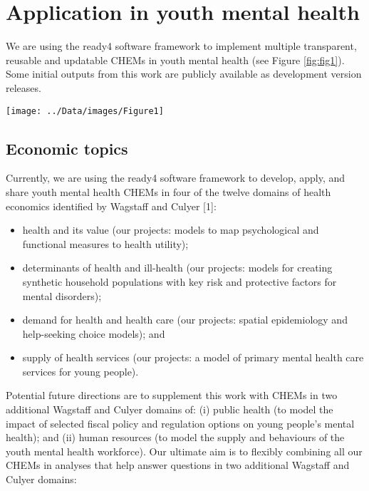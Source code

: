 \documentclass[
]{article}
\let\origfigure\figure
\let\endorigfigure\endfigure
\renewenvironment{figure}[1][2] {
    \expandafter\origfigure\expandafter[H]
} {
    \endorigfigure
}
\begin{document}
\hypertarget{application-in-youth-mental-health}{%
\section{Application in youth mental health}\label{application-in-youth-mental-health}}

We are using the ready4 software framework to implement multiple transparent, reusable and updatable CHEMs in youth mental health (see Figure \ref{fig:fig1}). Some initial outputs from this work are publicly available as development version releases.

\begin{figure}
\texttt{[image: ../Data/images/Figure1]} \caption{High level summary of planned implementation of youth mental health economic model}\label{fig:fig1}
\end{figure}

\hypertarget{economic-topics}{%
\subsection{Economic topics}\label{economic-topics}}

Currently, we are using the ready4 software framework to develop, apply, and share youth mental health CHEMs in four of the twelve domains of health economics identified by Wagstaff and Culyer {[}1{]}:

\begin{itemize}
\item
  health and its value (our projects: models to map psychological and functional measures to health utility);
\item
  determinants of health and ill-health (our projects: models for creating synthetic household populations with key risk and protective factors for mental disorders);
\item
  demand for health and health care (our projects: spatial epidemiology and help-seeking choice models); and
\item
  supply of health services (our projects: a model of primary mental health care services for young people).
\end{itemize}

Potential future directions are to supplement this work with CHEMs in two additional Wagstaff and Culyer domains of: (i) public health (to model the impact of selected fiscal policy and regulation options on young people's mental health); and (ii) human resources (to model the supply and behaviours of the youth mental health workforce). Our ultimate aim is to flexibly combining all our CHEMs in analyses that help answer questions in two additional Wagstaff and Culyer domains:
\end{document}
